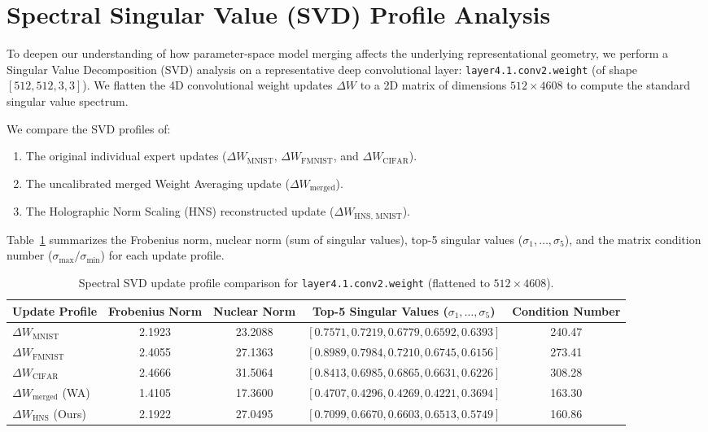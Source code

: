 \documentclass{article}
\theoremstyle{plain}
\theoremstyle{definition}
\theoremstyle{remark}
\begin{document}
\section{Spectral Singular Value (SVD) Profile Analysis}
\label{app:svd_analysis}

To deepen our understanding of how parameter-space model merging affects the underlying representational geometry, we perform a Singular Value Decomposition (SVD) analysis on a representative deep convolutional layer: \texttt{layer4.1.conv2.weight} (of shape $[512, 512, 3, 3]$). We flatten the 4D convolutional weight updates $\Delta W$ to a 2D matrix of dimensions $512 \times 4608$ to compute the standard singular value spectrum. 

We compare the SVD profiles of:
\begin{enumerate}
  \item The original individual expert updates ($\Delta W_{\text{MNIST}}$, $\Delta W_{\text{FMNIST}}$, and $\Delta W_{\text{CIFAR}}$).
  \item The uncalibrated merged Weight Averaging update ($\Delta W_{\text{merged}}$).
  \item The Holographic Norm Scaling (HNS) reconstructed update ($\Delta W_{\text{HNS, MNIST}}$).
\end{enumerate}

Table~\ref{tab:svd_profile} summarizes the Frobenius norm, nuclear norm (sum of singular values), top-5 singular values ($\sigma_1, \dots, \sigma_5$), and the matrix condition number ($\sigma_{\max} / \sigma_{\min}$) for each update profile.

\begin{table}[h]
  \caption{Spectral SVD update profile comparison for \texttt{layer4.1.conv2.weight} (flattened to $512 \times 4608$).}
  \label{tab:svd_profile}
  \centering
  \footnotesize
  \begin{tabular}{lcccc}
    \toprule
    \textbf{Update Profile} & \textbf{Frobenius Norm} & \textbf{Nuclear Norm} & \textbf{Top-5 Singular Values ($\sigma_1, \dots, \sigma_5$)} & \textbf{Condition Number} \\
    \midrule
    $\Delta W_{\text{MNIST}}$ & 2.1923 & 23.2088 & $[0.7571, 0.7219, 0.6779, 0.6592, 0.6393]$ & 240.47 \\
    $\Delta W_{\text{FMNIST}}$ & 2.4055 & 27.1363 & $[0.8989, 0.7984, 0.7210, 0.6745, 0.6156]$ & 273.41 \\
    $\Delta W_{\text{CIFAR}}$ & 2.4666 & 31.5064 & $[0.8413, 0.6985, 0.6865, 0.6631, 0.6226]$ & 308.28 \\
    \midrule
    $\Delta W_{\text{merged}}$ (WA) & 1.4105 & 17.3600 & $[0.4707, 0.4296, 0.4269, 0.4221, 0.3694]$ & 163.30 \\
    $\Delta W_{\text{HNS}}$ (Ours) & 2.1922 & 27.0495 & $[0.7099, 0.6670, 0.6603, 0.6513, 0.5749]$ & 160.86 \\
    \bottomrule
  \end{tabular}
\end{table}
\end{document}
